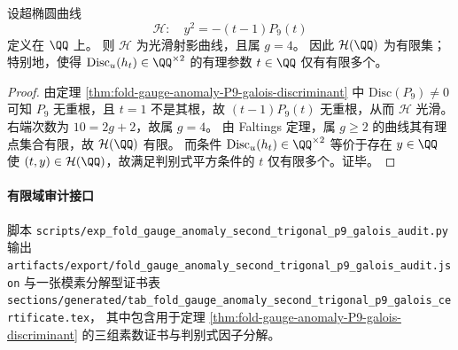 \begin{theorem}\label{thm:fold-gauge-anomaly-P9-discriminant-square-finiteness}
设超椭圆曲线
\[
\mathcal H:\quad y^2=-(t-1)P_9(t)
\]
定义在 \(\QQ\) 上。
则 \(\mathcal H\) 为光滑射影曲线，且属 \(g=4\)。
因此 \(\mathcal H(\QQ)\) 为有限集；特别地，使得 \(\mathrm{Disc}_u(h_t)\in\QQ^{\times 2}\) 的有理参数 \(t\in\QQ\) 仅有有限多个。
\end{theorem}
\begin{proof}
由定理 \ref{thm:fold-gauge-anomaly-P9-galois-discriminant} 中 \(\mathrm{Disc}(P_9)\neq 0\) 可知 \(P_9\) 无重根，且 \(t=1\) 不是其根，故 \((t-1)P_9(t)\) 无重根，从而 \(\mathcal H\) 光滑。
右端次数为 \(10=2g+2\)，故属 \(g=4\)。
由 Faltings 定理，属 \(g\ge 2\) 的曲线其有理点集合有限，故 \(\mathcal H(\QQ)\) 有限。
而条件 \(\mathrm{Disc}_u(h_t)\in\QQ^{\times 2}\) 等价于存在 \(y\in\QQ\) 使 \((t,y)\in\mathcal H(\QQ)\)，故满足判别式平方条件的 \(t\) 仅有限多个。证毕。
\end{proof}

\paragraph{有限域审计接口}
脚本 \texttt{scripts/exp\_fold\_gauge\_anomaly\_second\_trigonal\_p9\_galois\_audit.py} 输出
\texttt{artifacts/export/fold\_gauge\_anomaly\_second\_trigonal\_p9\_galois\_audit.json}
与一张模素分解型证书表
\texttt{sections/generated/tab\_fold\_gauge\_anomaly\_second\_trigonal\_p9\_galois\_certificate.tex}，
其中包含用于定理 \ref{thm:fold-gauge-anomaly-P9-galois-discriminant} 的三组素数证书与判别式因子分解。

\endinput

